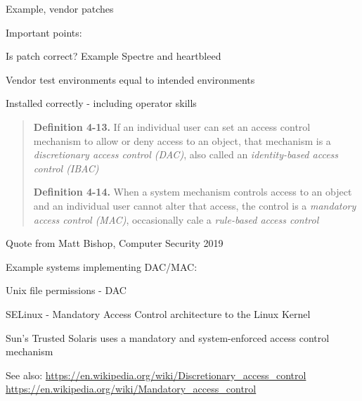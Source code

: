 \documentclass[Screen16to9,17pt]{foils}
\begin{document}
\begin{list1}
\item Example, vendor patches
\item Important points:
\begin{list2}
\item Is patch correct? Example Spectre and heartbleed
\item Vendor test environments equal to intended environments
\item Installed correctly - including operator skills
\end{list2}
\end{list1}



\begin{quote}
{\bf Definition 4-13.} If an individual user can set an access control mechanism to allow or deny access to an object, that mechanism is a \emph{discretionary access control (DAC)}, also called an \emph{identity-based access control (IBAC)}

{\bf Definition 4-14.}  When a system mechanism controls access to an object and an individual user cannot alter that access, the control is a \emph{mandatory access control (MAC)}, occasionally cale a \emph{rule-based access control}
\end{quote}

Quote from Matt Bishop, Computer Security 2019


Example systems implementing DAC/MAC:
\begin{list2}
\item Unix file permissions - DAC
\item SELinux - Mandatory Access Control architecture to the Linux Kernel
\item Sun's Trusted Solaris uses a mandatory and system-enforced access control mechanism
\end{list2}

See also:
\url{https://en.wikipedia.org/wiki/Discretionary_access_control}\\
\url{https://en.wikipedia.org/wiki/Mandatory_access_control}

\end{document}
